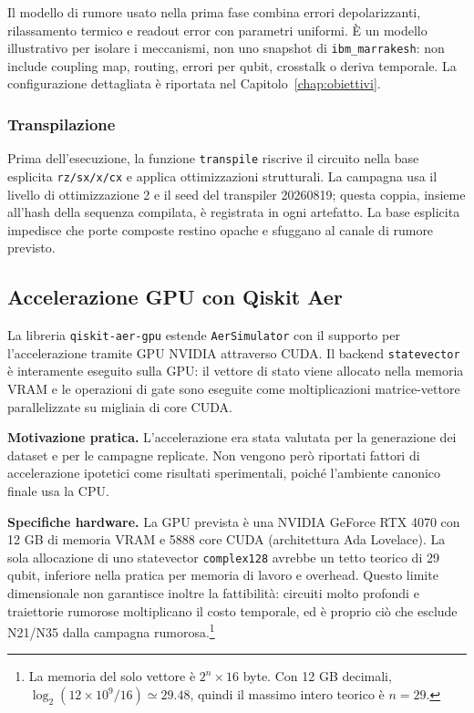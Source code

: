 \begin{onehalfspace}
Il modello di rumore usato nella prima fase combina errori depolarizzanti, rilassamento termico e readout error con parametri uniformi. È un modello illustrativo per isolare i meccanismi, non uno snapshot di \texttt{ibm\_marrakesh}: non include coupling map, routing, errori per qubit, crosstalk o deriva temporale. La configurazione dettagliata è riportata nel Capitolo~\ref{chap:obiettivi}.

\subsubsection{Transpilazione}

Prima dell'esecuzione, la funzione \texttt{transpile} riscrive il circuito nella base esplicita \texttt{rz/sx/x/cx} e applica ottimizzazioni strutturali. La campagna usa il livello di ottimizzazione 2 e il seed del transpiler 20260819; questa coppia, insieme all'hash della sequenza compilata, è registrata in ogni artefatto. La base esplicita impedisce che porte composte restino opache e sfuggano al canale di rumore previsto.

\subsection{Accelerazione GPU con Qiskit Aer}
\label{sec:gpu}

La libreria \texttt{qiskit-aer-gpu} estende \texttt{AerSimulator} con il supporto per l'accelerazione tramite \ac{GPU} NVIDIA attraverso CUDA. Il backend \texttt{statevector} è interamente eseguito sulla \ac{GPU}: il vettore di stato viene allocato nella memoria VRAM e le operazioni di gate sono eseguite come moltiplicazioni matrice-vettore parallelizzate su migliaia di core CUDA.

\textbf{Motivazione pratica.} L'accelerazione era stata valutata per la generazione dei dataset e per le campagne replicate. Non vengono però riportati fattori di accelerazione ipotetici come risultati sperimentali, poiché l'ambiente canonico finale usa la \ac{CPU}.

\textbf{Specifiche hardware.} La \ac{GPU} prevista è una NVIDIA GeForce RTX 4070 con 12 GB di memoria VRAM e 5888 core CUDA (architettura Ada Lovelace). La sola allocazione di uno statevector \texttt{complex128} avrebbe un tetto teorico di 29 qubit, inferiore nella pratica per memoria di lavoro e overhead. Questo limite dimensionale non garantisce inoltre la fattibilità: circuiti molto profondi e traiettorie rumorose moltiplicano il costo temporale, ed è proprio ciò che esclude N21/N35 dalla campagna rumorosa.\footnote{La memoria del solo vettore è $2^n \times 16$ byte. Con 12 GB decimali, $\log_2(12 \times 10^9 / 16)\simeq29.48$, quindi il massimo intero teorico è $n=29$.}


\end{onehalfspace}
